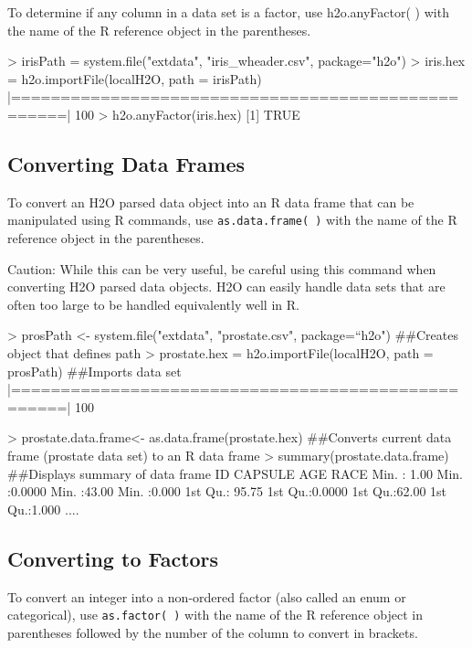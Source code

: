 \documentclass[11pt]{article}
\begin{document}
\begin{enumerate}
\begin{spverbatim}
To determine if any column in a data set is a factor, use h2o.anyFactor( ) with the name of the R reference object in the parentheses. 

> irisPath = system.file("extdata", "iris_wheader.csv", package="h2o")
> iris.hex = h2o.importFile(localH2O, path = irisPath)
|===================================================| 100%
> h2o.anyFactor(iris.hex)
[1] TRUE
\end{spverbatim}

\subsection{Converting Data Frames}

To convert an H2O parsed data object into an R data frame that can be manipulated using R commands, use {\texttt{as.data.frame( )}} with the name of the R reference object in the parentheses.

Caution: While this can be very useful, be careful using this command when converting H2O parsed data objects. H2O can easily handle data sets that are often too large to be handled equivalently well in R. 

\begin{spverbatim}

> prosPath <- system.file("extdata", "prostate.csv", package=“h2o")
##Creates object that defines path
 > prostate.hex = h2o.importFile(localH2O, path = prosPath)
##Imports data set
  |===================================================| 100%

 > prostate.data.frame<- as.data.frame(prostate.hex)
##Converts current data frame (prostate data set) to an R data frame
 > summary(prostate.data.frame) ##Displays summary of data frame
       ID            CAPSULE            AGE             RACE
Min.   :  1.00   Min.   :0.0000   Min.   :43.00   Min.   :0.000
1st Qu.: 95.75   1st Qu.:0.0000   1st Qu.:62.00   1st Qu.:1.000
       .... 
\end{spverbatim}


\subsection{Converting to Factors}

To convert an integer into a non-ordered factor (also called an enum or categorical), use {\texttt{as.factor( )}} with the name of the R reference object in parentheses followed by the number of the column to convert in brackets. 
\begin{spverbatim}


\end{spverbatim}
\end{enumerate}
\end{document}
